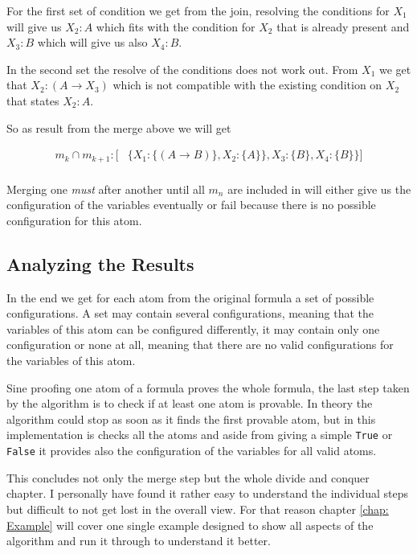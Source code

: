 For the first set of condition we get from the join, resolving the conditions for $X_1$ will give us $X_2:A$ which fits with the condition for $X_2$ that is already present and $X_3: B$ which will give us also $X_4: B$.

In the second set the resolve of the conditions does not work out. From $X_1$ we get that $X_2: (A \rightarrow X_3)$ which is not compatible with the existing condition on $X_2$ that states $X_2: A$.

So as result from the merge above we will get

\begin{align*}
	m_k \cap m_{k+1}: [	& \{X_1: \{(A \rightarrow B)\}, X_2: \{A\}\}, X_3: \{B\}, X_4: \{B\}\}]\\
\end{align*}

Merging one \emph{must} after another until all $m_n$ are included in will either give us the configuration of the variables eventually or fail because there is no possible configuration for this atom.

\subsection{Analyzing the Results}
In the end we get for each atom from the original formula a set of possible configurations. A set may contain several configurations, meaning that the variables of this atom can be configured differently, it may contain only one configuration or none at all, meaning that there are no valid configurations for the variables of this atom.

Sine proofing one atom of a formula proves the whole formula, the last step taken by the algorithm is to check if at least one atom is provable. In theory the algorithm could stop as soon as it finds the first provable atom, but in this implementation is checks all the atoms and aside from giving a simple \texttt{True} or \texttt{False} it provides also the configuration of the variables for all valid atoms.



\bigskip
\par This concludes not only the merge step but the whole divide and conquer chapter. I personally have found it rather easy to understand the individual steps but difficult to not get lost in the overall view. For that reason chapter \ref{chap: Example} will cover one single example designed to show all aspects of the algorithm and run it through to understand it better.